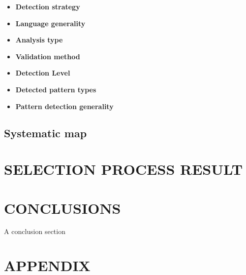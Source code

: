 \documentclass[letterpaper, 10 pt, conference]{ieeeconf}  %
\begin{document}
\begin{itemize}
	\item \textbf{Detection strategy}
	\item \textbf{Language generality}
	\item \textbf{Analysis type}
	\item \textbf{Validation method}
	\item \textbf{Detection Level}
	\item \textbf{Detected pattern types}
	\item \textbf{Pattern detection generality}
\end{itemize}


\subsection{Systematic map}

\section{SELECTION PROCESS RESULT}


\section{CONCLUSIONS}

A conclusion section 



\addtolength{\textheight}{-12cm}   








\section*{APPENDIX}
\end{document}
